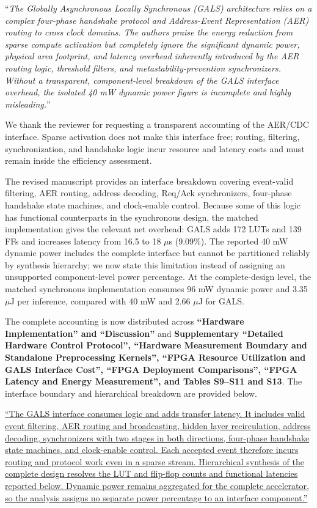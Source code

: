 \documentclass[12pt,technote,onecolumn]{IEEEtran}
\begin{document}
``{\it The Globally Asynchronous Locally Synchronous (GALS) architecture relies
on a complex four-phase handshake protocol and Address-Event
Representation (AER) routing to cross clock domains. The authors praise
the energy reduction from sparse compute activation but completely
ignore the significant dynamic power, physical area footprint, and
latency overhead inherently introduced by the AER routing logic,
threshold filters, and metastability-prevention synchronizers. Without a
transparent, component-level breakdown of the GALS interface overhead,
the isolated 40 mW dynamic power figure is incomplete and highly
misleading.}''
\vspace{1mm}


We thank the reviewer for requesting a transparent accounting of the AER/CDC interface. Sparse activation does not make this interface free; routing, filtering, synchronization, and handshake logic incur resource and latency costs and must remain inside the efficiency assessment.

The revised manuscript provides an interface breakdown covering
event-valid filtering, AER routing, address decoding, Req/Ack
synchronizers, four-phase handshake state machines, and clock-enable
control. Because some of this logic has functional counterparts in the
synchronous design, the matched implementation gives the relevant net
overhead: GALS adds 172 LUTs and 139 FFs and increases latency from 16.5
to 18 $\mu$s (9.09\%). The
reported 40 mW dynamic power includes the complete interface but cannot
be partitioned reliably by synthesis hierarchy; we now state this
limitation instead of assigning an unsupported component-level power
percentage. At the complete-design level, the matched synchronous
implementation consumes 96 mW dynamic power and 3.35 $\mu$J per
inference, compared with 40 mW and 2.66 $\mu$J for GALS.



The complete accounting is now distributed across \textbf{``Hardware Implementation'' and ``Discussion''} and \textbf{Supplementary ``Detailed Hardware Control Protocol'', ``Hardware Measurement Boundary and Standalone Preprocessing Kernels'', ``FPGA Resource Utilization and GALS Interface Cost'', ``FPGA Deployment Comparisons'', ``FPGA Latency and Energy Measurement'', and Tables S9--S11 and S13}. The interface boundary and hierarchical breakdown are provided below.

\uline{``The GALS interface consumes logic and adds transfer latency. It includes valid event filtering, AER routing and broadcasting, hidden layer recirculation, address decoding, synchronizers with two stages in both directions, four-phase handshake state machines, and clock-enable control. Each accepted event therefore incurs routing and protocol work even in a sparse stream. Hierarchical synthesis of the complete design resolves the LUT and flip-flop counts and functional latencies reported below. Dynamic power remains aggregated for the complete accelerator, so the analysis assigns no separate power percentage to an interface component.''}
\end{document}
